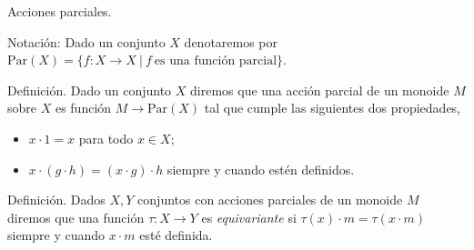 \documentclass[aspectratio=169, 9pt]{beamer}
\newcommand{\Par}{\text{Par}(X)}
\begin{document}

\begin{frame}[fragile]{Acciones parciales.}
	
	
	\bigskip
	
	Notación: Dado un conjunto $X$ denotaremos por $\Par = \{ f: X \to X \ | \  f \ \text{es una función parcial} \}$.
	
	\begin{alertblock}{Definición.}
		Dado un conjunto $X$ diremos que una acción parcial de un monoide $M$ sobre $X$ es función $M \to \Par$ tal que cumple las siguientes dos propiedades,
		\begin{itemize}
			\item $x \cdot 1 = x$ para todo $x \in X$;
			\item $x \cdot (g \cdot h) = (x \cdot g) \cdot h$ siempre y cuando estén definidos.
		\end{itemize} 
	\end{alertblock}
	\begin{alertblock}{Definición.}
		Dados $X, Y$ conjuntos con acciones parciales de un monoide $M$ diremos que una función $\tau: X \to Y$ es \emph{equivariante} si $\tau (x) \cdot m = \tau (x \cdot m)$ siempre y cuando $x \cdot m$ esté definida.
	\end{alertblock}
\end{frame}
\end{document}
